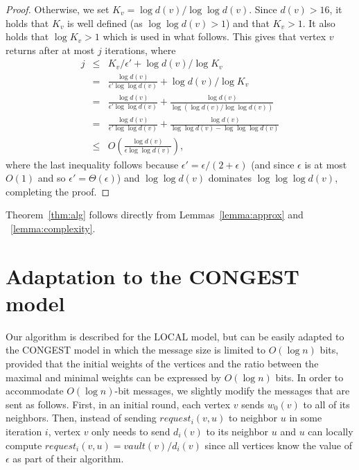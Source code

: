 \documentclass[11pt]{article}
\newcommand{\Deal}{request}
\newcommand{\Vault}{vault}
\begin{document}
\begin{proof}
Otherwise, we set $K_v=\log{d(v)}/\log{\log{d(v)}}$. Since $d(v)>16$, it holds that $K_v$ is well defined (as $\log\log{d(v)}>1$) and that $K_v>1$. It also holds that $\log{K_v}>1$ which is used in what follows.
This gives that vertex $v$ returns after at most $j$ iterations, where
\begin{eqnarray*}
j &\leq&  K_v/\epsilon' + \log{d(v)}/\log{K_v}\\
&=& \frac{\log{d(v)}}{\epsilon'\log{\log{d(v)}}} +\log{d(v)}/\log{K_v}\\
&=& \frac{\log{d(v)}}{\epsilon'\log{\log{d(v)}}} + \frac{\log{d(v)}}{\log{(\log{d(v)}/\log{\log{d(v)}})}}\\
&=& \frac{\log{d(v)}}{\epsilon'\log{\log{d(v)}}} + \frac{\log{d(v)}}{\log\log{d(v)}-\log\log{\log{d(v)}}}\\
&\leq& O\left(\frac{\log{d(v)}}{\epsilon\log\log{d(v)}}\right),
\end{eqnarray*}
where the last inequality follows because $\epsilon'= \epsilon/(2+\epsilon)$ (and since $\epsilon$ is at most $O(1)$ and so $\epsilon'=\Theta(\epsilon)$) and $\log\log{d(v)}$ dominates $\log\log\log{d(v)}$, completing the proof.
\end{proof}

Theorem~\ref{thm:alg} follows directly from Lemmas~\ref{lemma:approx} and ~\ref{lemma:complexity}.

\section{Adaptation to the CONGEST model}
\label{sec:discussion}
Our algorithm is described for the LOCAL model, but can be easily adapted to the CONGEST model in which the message size is limited to $O(\log{n})$ bits, provided that the initial weights of the vertices and the ratio between the maximal and minimal weights can be expressed by $O(\log{n})$ bits. In order to accommodate $O(\log{n})$-bit messages, we slightly modify the messages that are sent as follows. First, in an initial round, each vertex $v$ sends $w_0(v)$ to all of its neighbors. Then, instead of sending $\Deal_i(v,u)$ to neighbor $u$ in some iteration $i$, vertex $v$ only needs to send $d_i(v)$ to its neighbor $u$ and $u$ can locally compute $\Deal_i(v,u)=\Vault(v)/d_i(v)$ since all vertices know the value of $\epsilon$ as part of their algorithm.
\end{document}
